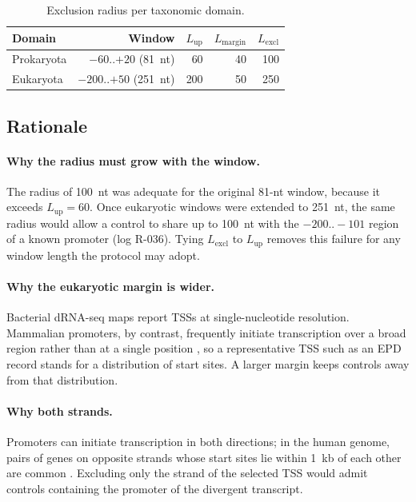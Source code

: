 \begin{table}[htbp]
  \centering
  \caption{Exclusion radius per taxonomic domain.}
  \begin{tabular}{lrrrr}
    \toprule
    Domain & Window & $L_{\mathrm{up}}$ & $L_{\mathrm{margin}}$ & $L_{\mathrm{excl}}$ \\
    \midrule
    Prokaryota & $-60..{+20}$ (81~nt) & 60 & 40 & 100 \\
    Eukaryota & $-200..{+50}$ (251~nt) & 200 & 50 & 250 \\
    \bottomrule
  \end{tabular}
\end{table}

\subsection{Rationale}

\paragraph{Why the radius must grow with the window.}
The radius of 100~nt was adequate for the original 81-nt window, because it
exceeds $L_{\mathrm{up}}=60$. Once eukaryotic windows were extended to 251~nt, the same
radius would allow a control to share up to 100~nt with the $-200..-101$ region
of a known promoter (log R-036). Tying $L_{\mathrm{excl}}$ to $L_{\mathrm{up}}$ removes this failure for any
window length the protocol may adopt.

\paragraph{Why the eukaryotic margin is wider.}
Bacterial dRNA-seq maps report TSSs at single-nucleotide resolution. Mammalian
promoters, by contrast, frequently initiate transcription over a broad region
rather than at a single position \citep{carninci2006genome,haberle2018eukaryotic},
so a representative TSS such as an EPD record \citep{meylan2020epd} stands for
a distribution of start sites. A larger margin keeps controls away from that
distribution.

\paragraph{Why both strands.}
Promoters can initiate transcription in both directions; in the human genome,
pairs of genes on opposite strands whose start sites lie within 1~kb of each
other are common \citep{trinklein2004abundance}. Excluding only the strand of the
selected TSS would admit controls containing the promoter of the divergent
transcript.

